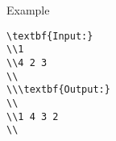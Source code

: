 Example
\begin{verbatim}
\textbf{Input:}
\\1
\\4 2 3
\\
\\\textbf{Output:}
\\
\\1 4 3 2
\\\end{verbatim}